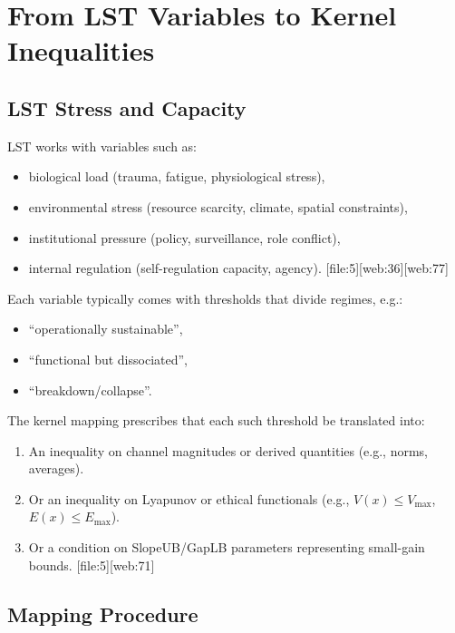 \documentclass[11pt]{article}
\begin{document}
\section{From LST Variables to Kernel Inequalities}

\subsection{LST Stress and Capacity}

LST works with variables such as:

\begin{itemize}[leftmargin=*]
  \item biological load (trauma, fatigue, physiological stress),
  \item environmental stress (resource scarcity, climate, spatial constraints),
  \item institutional pressure (policy, surveillance, role conflict),
  \item internal regulation (self-regulation capacity, agency). [file:5][web:36][web:77]
\end{itemize}

Each variable typically comes with thresholds that divide regimes, e.g.:

\begin{itemize}[leftmargin=*]
  \item ``operationally sustainable'',
  \item ``functional but dissociated'',
  \item ``breakdown/collapse''.
\end{itemize}

The kernel mapping prescribes that each such threshold be translated into:

\begin{enumerate}[label=(\alph*), leftmargin=*]
  \item An inequality on channel magnitudes or derived quantities (e.g., norms, averages).
  \item Or an inequality on Lyapunov or ethical functionals (e.g., \(V(x)\leq V_{\max}\), \(E(x)\leq E_{\max}\)).
  \item Or a condition on SlopeUB/GapLB parameters representing small-gain bounds. [file:5][web:71]
\end{enumerate}

\subsection{Mapping Procedure}
\end{document}
